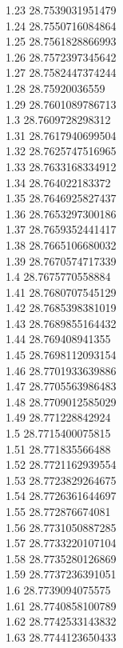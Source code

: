 {1.23	28.7539031951479\\
1.24	28.7550716084864\\
1.25	28.7561828866993\\
1.26	28.7572397345642\\
1.27	28.7582447374244\\
1.28	28.75920036559\\
1.29	28.7601089786713\\
1.3	28.7609728298312\\
1.31	28.7617940699504\\
1.32	28.7625747516965\\
1.33	28.7633168334912\\
1.34	28.764022183372\\
1.35	28.7646925827437\\
1.36	28.7653297300186\\
1.37	28.7659352441417\\
1.38	28.7665106680032\\
1.39	28.7670574717339\\
1.4	28.7675770558884\\
1.41	28.7680707545129\\
1.42	28.7685398381019\\
1.43	28.7689855164432\\
1.44	28.769408941355\\
1.45	28.7698112093154\\
1.46	28.7701933639886\\
1.47	28.7705563986483\\
1.48	28.7709012585029\\
1.49	28.771228842924\\
1.5	28.7715400075815\\
1.51	28.771835566488\\
1.52	28.7721162939554\\
1.53	28.7723829264675\\
1.54	28.7726361644697\\
1.55	28.772876674081\\
1.56	28.7731050887285\\
1.57	28.7733220107104\\
1.58	28.7735280126869\\
1.59	28.7737236391051\\
1.6	28.7739094075575\\
1.61	28.7740858100789\\
1.62	28.7742533143832\\
1.63	28.7744123650433\\
}
